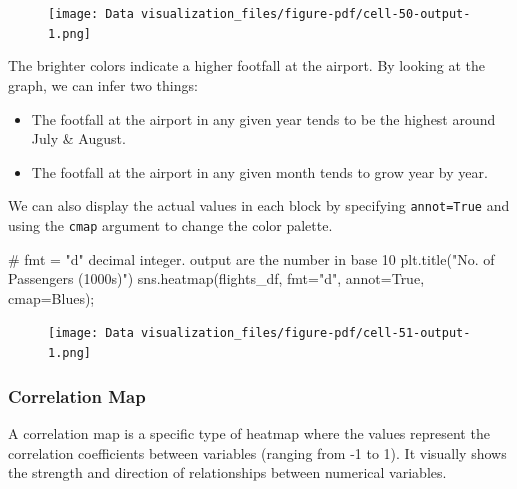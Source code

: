 \documentclass[
  letterpaper,
  DIV=11,
  numbers=noendperiod]{scrreprt}
\newenvironment{Shaded}{\begin{snugshade}}{\end{snugshade}}
\newcommand{\CommentTok}[1]{\textcolor[rgb]{0.37,0.37,0.37}{#1}}
\newcommand{\NormalTok}[1]{\textcolor[rgb]{0.00,0.23,0.31}{#1}}
\newcommand{\OperatorTok}[1]{\textcolor[rgb]{0.37,0.37,0.37}{#1}}
\newcommand{\StringTok}[1]{\textcolor[rgb]{0.13,0.47,0.30}{#1}}
\newcommand{\VariableTok}[1]{\textcolor[rgb]{0.07,0.07,0.07}{#1}}
\providecommand{\tightlist}{%
  \setlength{\itemsep}{0pt}\setlength{\parskip}{0pt}}\usepackage{longtable,booktabs,array}
\begin{document}
\begin{figure}[H]

{\centering \texttt{[image: Data visualization\_files/figure-pdf/cell-50-output-1.png]}

}

\end{figure}

The brighter colors indicate a higher footfall at the airport. By
looking at the graph, we can infer two things:

\begin{itemize}
\tightlist
\item
  The footfall at the airport in any given year tends to be the highest
  around July \& August.
\item
  The footfall at the airport in any given month tends to grow year by
  year.
\end{itemize}

We can also display the actual values in each block by specifying
\texttt{annot=True} and using the \texttt{cmap} argument to change the
color palette.

\begin{Shaded}
\begin{Highlighting}[]
\CommentTok{\# fmt = "d" decimal integer. output are the number in base 10}
\NormalTok{plt.title(}\StringTok{"No. of Passengers (1000s)"}\NormalTok{)}
\NormalTok{sns.heatmap(flights\_df, fmt}\OperatorTok{=}\StringTok{"d"}\NormalTok{, annot}\OperatorTok{=}\VariableTok{True}\NormalTok{, cmap}\OperatorTok{=}\StringTok{\textquotesingle{}Blues\textquotesingle{}}\NormalTok{)}\OperatorTok{;}
\end{Highlighting}
\end{Shaded}

\begin{figure}[H]

{\centering \texttt{[image: Data visualization\_files/figure-pdf/cell-51-output-1.png]}

}

\end{figure}

\hypertarget{correlation-map}{%
\subsubsection{Correlation Map}\label{correlation-map}}

A correlation map is a specific type of heatmap where the values
represent the correlation coefficients between variables (ranging from
-1 to 1). It visually shows the strength and direction of relationships
between numerical variables.
\end{document}
